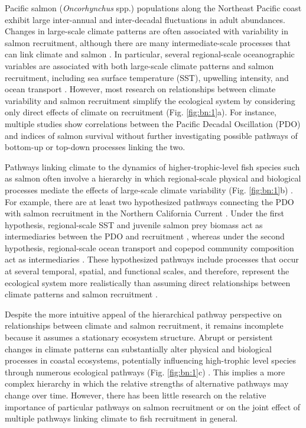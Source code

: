 Pacific salmon (\emph{Oncorhynchus} spp.) populations along the Northeast
Pacific coast exhibit large inter-annual and inter-decadal fluctuations in adult
abundances. Changes in large-scale climate patterns are often associated with
variability in salmon recruitment, although there are many intermediate-scale
processes that can link climate and salmon \citep{Mueter2002a, Beamish2004b,
Drinkwater2010a, Malick2015a}. In particular, several regional-scale
oceanographic variables are associated with both large-scale climate patterns
and salmon recruitment, including sea surface temperature (SST), upwelling
intensity, and ocean transport \citep{King2011, Chavez2003a, Keister2011a}.
However, most research on relationships between climate variability and salmon
recruitment simplify the ecological system by considering only direct effects of
climate on recruitment (Fig. \ref{fig:bn:1}a). For instance, multiple studies
show correlations between the Pacific Decadal Oscillation (PDO) and indices of
salmon survival \citep{Mantua1997a, Burke2013, Malick2009a} without further
investigating possible pathways of bottom-up or top-down processes linking the
two.

Pathways linking climate to the dynamics of higher-trophic-level fish species
such as salmon often involve a hierarchy in which regional-scale physical and
biological processes mediate the effects of large-scale climate variability
(Fig. \ref{fig:bn:1}b) \citep{Drinkwater2010a, Ottersen2010a, Dippner2006}. For
example, there are at least two hypothesized pathways connecting the PDO with
salmon recruitment in the Northern California Current \citep{Wells2008a,
Keister2011a}. Under the first hypothesis, regional-scale SST and juvenile
salmon prey biomass act as intermediaries between the PDO and recruitment
\citep{Daly2013, Cole2000a}, whereas under the second hypothesis, regional-scale
ocean transport and copepod community composition act as intermediaries
\citep{Bi2011a, Keister2011a}. These hypothesized pathways include processes
that occur at several temporal, spatial, and functional scales, and therefore,
represent the ecological system more realistically than assuming direct
relationships between climate patterns and salmon recruitment \citep{Levin1992a,
Ottersen2010a, Bakun1996a, Hunt2002a}.

Despite the more intuitive appeal of the hierarchical pathway perspective on
relationships between climate and salmon recruitment, it remains incomplete
because it assumes a stationary ecosystem structure.  Abrupt or persistent
changes in climate patterns can substantially alter physical and biological
processes in coastal ecosystems, potentially influencing high-trophic level
species through numerous ecological pathways (Fig. \ref{fig:bn:1}c)
\citep{Anderson1999a, Mantua1997a}. This implies a more complex hierarchy in
which the relative strengths of alternative pathways may change over time.
However, there has been little research on the relative importance of particular
pathways on salmon recruitment or on the joint effect of multiple pathways
linking climate to fish recruitment in general.

